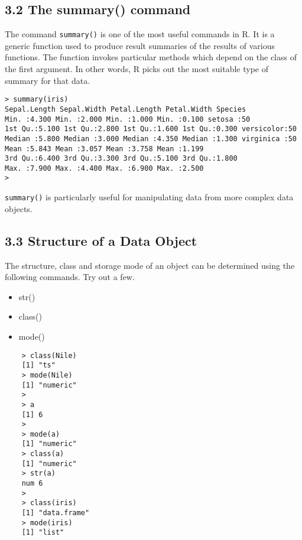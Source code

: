 \subsection*{3.2 The summary() command}
The command \texttt{summary()} is one of the most useful commands in R. It is a generic function used
to produce result summaries of the results of various functions. The function invokes particular
methods which depend on the class of the first argument. In other words, R picks out the most
suitable type of summary for that data.
\begin{framed}
\begin{verbatim}
> summary(iris)
Sepal.Length Sepal.Width Petal.Length Petal.Width Species
Min. :4.300 Min. :2.000 Min. :1.000 Min. :0.100 setosa :50
1st Qu.:5.100 1st Qu.:2.800 1st Qu.:1.600 1st Qu.:0.300 versicolor:50
Median :5.800 Median :3.000 Median :4.350 Median :1.300 virginica :50
Mean :5.843 Mean :3.057 Mean :3.758 Mean :1.199
3rd Qu.:6.400 3rd Qu.:3.300 3rd Qu.:5.100 3rd Qu.:1.800
Max. :7.900 Max. :4.400 Max. :6.900 Max. :2.500
>

\end{verbatim}
\end{framed}
\texttt{summary()} is particularly useful for manipulating data from more complex data objects.

\subsection{3.3 Structure of a Data Object}
The structure, class and storage mode of an object can be determined using the following
commands. Try out a few.
\begin{itemize}
	\item str()
	\item class()
	\item mode()
\end{itemize}
\begin{framed}
	\begin{verbatim}
	> class(Nile)
	[1] "ts"
	> mode(Nile)
	[1] "numeric"
	>
	> a
	[1] 6
	>
	> mode(a)
	[1] "numeric"
	> class(a)
	[1] "numeric"
	> str(a)
	num 6
	>
	> class(iris)
	[1] "data.frame"
	> mode(iris)
	[1] "list"
	\end{verbatim}
\end{framed}


